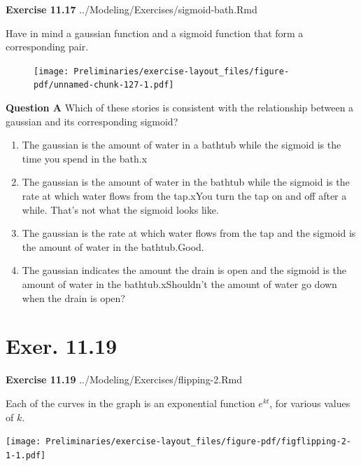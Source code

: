 \documentclass[
  letterpaper,
  DIV=11,
  numbers=noendperiod,
  oneside]{article}
\providecommand{\tightlist}{%
  \setlength{\itemsep}{0pt}\setlength{\parskip}{0pt}}\usepackage{longtable,booktabs,array}
\begin{document}
\begin{multicols}{2}
\textbf{Exercise 11.17} ../Modeling/Exercises/sigmoid-bath.Rmd

Have in mind a gaussian function and a sigmoid function that form a
corresponding pair.

\begin{figure}

{\centering \texttt{[image: Preliminaries/exercise-layout\_files/figure-pdf/unnamed-chunk-127-1.pdf]}

}

\end{figure}

\textbf{Question A} Which of these stories is consistent with the
relationship between a gaussian and its corresponding sigmoid?

\begin{enumerate}
\def\labelenumi{\roman{enumi}.}
\tightlist
\item
  {The gaussian is the amount of water in a bathtub while the sigmoid is
  the time you spend in the bath.{x}}\\
\item
  {The gaussian is the amount of water in the bathtub while the sigmoid
  is the rate at which water flows from the tap.{xYou turn the tap on
  and off after a while. That's not what the sigmoid looks like.}}\\
\item
  {The gaussian is the rate at which water flows from the tap and the
  sigmoid is the amount of water in the bathtub.{Good.~}}\\
\item
  {The gaussian indicates the amount the drain is open and the sigmoid
  is the amount of water in the bathtub.{xShouldn't the amount of
  water go down when the drain is open?}}
\end{enumerate}

\hypertarget{exer.-11.19}{%
\section*{Exer. 11.19}\label{exer.-11.19}}

\textbf{Exercise 11.19} ../Modeling/Exercises/flipping-2.Rmd

Each of the curves in the graph is an exponential function \(e^{kt}\),
for various values of \(k\).

\texttt{[image: Preliminaries/exercise-layout\_files/figure-pdf/figflipping-2-1-1.pdf]}


\end{multicols}
\end{document}
